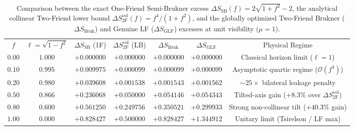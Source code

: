 \begin{table}[t]
\caption{Comparison between the exact One-Friend Semi-Brukner excess $\Delta S_{\mathrm{SB}}(f) = 2\sqrt{1+f^2}-2$, the analytical collinear Two-Friend lower bound $\Delta S_{2\mathrm{F}}^{\mathrm{col}}(f) = f^4/(1+f^2)$, and the globally optimized Two-Friend Brukner ($\Delta S_{\mathrm{Bruk}}$) and Genuine LF ($\Delta S_{\mathrm{GLF}}$) excesses at unit visibility ($\mu = 1$).}
\label{tab:scaling_comparison}
\begin{ruledtabular}
\begin{tabular}{ccccccc}
$f$ & $\ell = \sqrt{1-f^2}$ & $\Delta S_{\mathrm{SB}}$ (1F) & $\Delta S_{2\mathrm{F}}^{\mathrm{col}}$ (LB) & $\Delta S_{\mathrm{Bruk}}$ & $\Delta S_{\mathrm{GLF}}$ & Physical Regime \\
\colrule
$0.00$ & $1.000$ & $+0.000000$ & $+0.000000$ & $+0.000000$ & $+0.000000$ & Classical horizon limit ($\ell = 1$) \\
$0.10$ & $0.995$ & $+0.009975$ & $+0.000099$ & $+0.000099$ & $+0.000099$ & Asymptotic quartic regime ($\mathcal{O}(f^4)$) \\
$0.20$ & $0.980$ & $+0.039608$ & $+0.001538$ & $+0.001543$ & $+0.001562$ & ${\sim}25\times$ bilateral leakage penalty \\
$0.50$ & $0.866$ & $+0.236068$ & $+0.050000$ & $+0.054146$ & $+0.054343$ & Tilted-axis gain ($+8.3\%$ over $\Delta S_{2\mathrm{F}}^{\mathrm{col}}$) \\
$0.80$ & $0.600$ & $+0.561250$ & $+0.249756$ & $+0.350521$ & $+0.299933$ & Strong non-collinear tilt ($+40.3\%$ gain) \\
$1.00$ & $0.000$ & $+0.828427$ & $+0.500000$ & $+0.828427$ & $+1.344912$ & Unitary limit (Tsirelson / LF max) \\
\end{tabular}
\end{ruledtabular}
\end{table}

